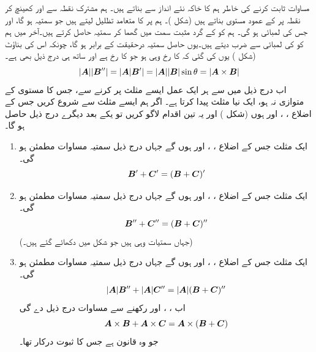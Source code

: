 مساوات  ثابت کرنے کی خاطر ہم  کا خاکہ نئے انداز سے  بناتے ہیں۔ ہم مشترک نقطہ  سے  اور  کھینچ کر  نقطہ     پر  کے عمود   مستوی      بناتے ہیں (شکل )۔  ہم  پر  کا متعامد تظلیل لیتے ہیں جو سمتیہ   ہو گا،   اور جس کی لمبائی   ہو گی۔ ہم   کو  کے گرد مثبت سمت میں   گھما کر سمتیہ  حاصل کرتے ہیں۔آخر میں ہم    کو  کی لمبائی سے ضرب دیتے ہیں۔یوں حاصل سمتیہ    درحقیقت  کے برابر ہو گا، چونکہ اس کی بناؤٹ (شکل )   یوں کی گئی کہ   کا رخ  وہی ہو جو    کا رخ  ہے اور ساتھ ہی درج ذیل بھی ہے۔
\[|{{\boldsymbol{A}}}||{{\boldsymbol{B}}}''|=|{{\boldsymbol{A}}}|{{\boldsymbol{B}}}'|=|{{\boldsymbol{A}}}||{{\boldsymbol{B}}}|\sin\theta=|{{\boldsymbol{A}}}\times{\ensuremath{{\boldsymbol{B}}}}|\]
اب درج  ذیل میں سے ہر ایک عمل  ایسے   مثلث پر کرنے سے،   جس کا مستوی  کے  متوازی نہ ہو،  ایک نیا مثلث پیدا  کرتا ہے۔ اگر ہم ایسے مثلث سے شروع کریں جس کے اضلاع ، ، اور  ہوں (شکل ) اور  یہ  تین اقدام   لاگو کریں تو  یکے بعد دیگرے درج ذیل حاصل ہو گا۔
\begin{enumerate}[1.]
\item
ایک مثلث جس کے اضلاع ، ، اور  ہوں گے جہاں درج ذیل سمتیہ  مساوات مطمئن ہو گی۔
\[{{\boldsymbol{B}}}'+{{\boldsymbol{C}}}'=({{\boldsymbol{B}}}+{{\boldsymbol{C}}})'\]
\item
ایک مثلث جس کے اضلاع ، ، اور  ہوں گے جہاں درج ذیل سمتیہ  مساوات مطمئن ہو گی۔
\[{{\boldsymbol{B}}}''+{{\boldsymbol{C}}}''=({{\boldsymbol{B}}}+{{\boldsymbol{C}}})''\]
(جہاں سمتیات وہی ہیں جو شکل   میں دکھائے گئے ہیں۔)
\item
ایک مثلث جس کے اضلاع ، ، اور  ہوں گے جہاں درج ذیل سمتیہ  مساوات مطمئن ہو گی۔
\begin{align}\label{مساوات_ضمیمہ_جزئیتی_ب}
|{{\boldsymbol{A}}}|{{\boldsymbol{B}}}''+|{{\boldsymbol{A}}}|{{\boldsymbol{C}}}''=|{{\boldsymbol{A}}}|({{\boldsymbol{B}}}+{{\boldsymbol{C}}})''
\end{align}
اب ، ، اور 
  رکھنے 
سے مساوات  درج  ذیل دے گی 
\[{{\boldsymbol{A}}}\times{\ensuremath{{\boldsymbol{B}}}}+{{\boldsymbol{A}}}\times{\ensuremath{{\boldsymbol{C}}}}={{\boldsymbol{A}}}\times({{\boldsymbol{B}}}+{{\boldsymbol{C}}})\]
جو وہ قانون ہے جس کا ثبوت درکار تھا۔
\end{enumerate}
